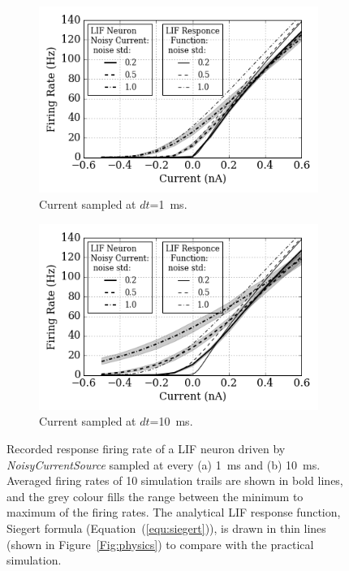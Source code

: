 \documentclass[runningheads,a4paper]{llncs}
\begin{document}
\begin{figure}[tbp!]
	\centering
	\begin{subfigure}[t]{0.49\textwidth}
		\includegraphics[width=\textwidth]{2-1.png}
		\caption{Current sampled at $dt$=1~ms.}
	\end{subfigure}
	\begin{subfigure}[t]{0.49\textwidth}
		\includegraphics[width=\textwidth]{2-10.png}
		\caption{Current sampled at $dt$=10~ms.}
	\end{subfigure}
	\caption{Recorded response firing rate of a LIF neuron driven by \textit{NoisyCurrentSource} sampled at every (a) 1~ms and (b) 10~ms. Averaged firing rates of 10 simulation trails are shown in bold lines, and the grey colour fills the range between the minimum to maximum of the firing rates. The analytical LIF response function, Siegert formula (Equation~(\ref{equ:siegert})), is drawn in thin lines (shown in Figure~\ref{Fig:physics}) to compare with the practical simulation.}
	\label{Fig:current}
\end{figure}
\end{document}

